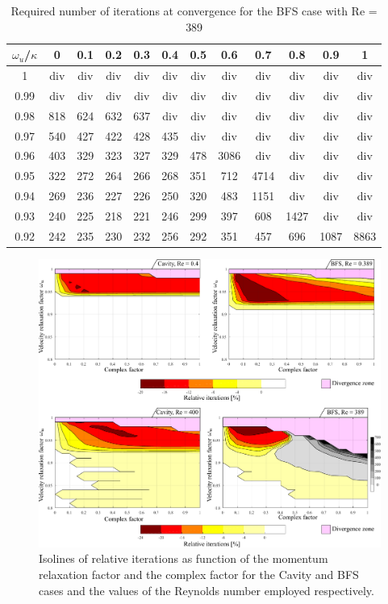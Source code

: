 \documentclass[final,3p,times,11pt,onecolumn]{myElsarticle}
\numberwithin{equation}{section}
\begin{document}
\begin{table}[t!!]
\centering
\begin{tabular}{c|ccccccccccc}
\hline 
$\omega_u$/$\kappa$ & 0 & 0.1 & 0.2 & 0.3 & 0.4 & 0.5 & 0.6 & 0.7 & 0.8 & 0.9 & 1 \\ 
\hline 
1 & div & div & div & div & div & div & div & div & div & div & div \\ 
0.99 & div & div & div & div & div & div & div & div & div & div & div \\ 
0.98 & 818 & 624 & 632 & 637 & div & div & div & div & div & div & div \\ 
0.97 & 540 & 427 & 422 & 428 & 435 & div & div & div & div & div & div \\ 
0.96 & 403 & 329 & 323 & 327 & 329 & 478 & 3086 & div & div & div & div \\ 
0.95 & 322 & 272 & 264 & 266 & 268 & 351 & 712 & 4714 & div & div & div \\ 
0.94 & 269 & 236 & 227 & 226 & 250 & 320 & 483 & 1151 & div & div & div \\ 
0.93 & 240 & 225 & 218 & 221 & 246 & 299 & 397 & 608 & 1427 & div & div \\ 
0.92 & 242 & 235 & 230 & 232 & 256 & 292 & 351 & 457 & 696 & 1087 & 8863 \\ 
\hline 
\end{tabular}
\caption{Required number of iterations at convergence for the BFS case with Re = 389}
\label{Table:BFS_HighRe}
\end{table}
\begin{figure}[t!!!!!!!]
\centering
\includegraphics[width=17cm]{fig/Results/FactorLowRe.pdf}
\caption{Isolines of relative iterations as function of the momentum relaxation factor and the complex factor for the Cavity and BFS cases and the values of the Reynolds number employed respectively.}
\label{Fig:FactorLowRe}
\end{figure}
\end{document}
